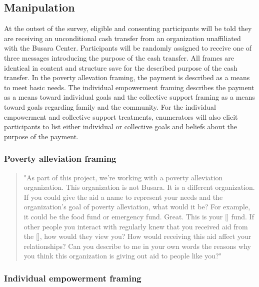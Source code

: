 \documentclass[11pt, a4paper]{article}\usepackage[]{graphicx}\usepackage[]{color}
\begin{document}
    \subsection{Manipulation}

        At the outset of the survey, eligible and consenting participants will be told they are receiving an unconditional cash transfer from an organization unaffiliated with the Busara Center. Participants will be randomly assigned to receive one of three messages introducing the purpose of the cash transfer. All frames are identical in content and structure save for the described purpose of the cash transfer. In the poverty allevation framing, the payment is described as a means to meet basic needs. The individual empowerment framing describes the payment as a means toward individual goals and the collective support framing as a means toward goals regarding family and the community. For the individual empowerment and collective support treatments, enumerators will also elicit participants to list either individual or collective goals and beliefs about the purpose of the payment.

        \subsubsection{Poverty alleviation framing}

            \begin{quote}

                "As part of this project, we're working with a poverty alleviation organization. This organization is not Busara. It is a different organization.
                If you could give the aid a name to represent your needs and the organization's goal of poverty alleviation, what would it be? For example, it could be the food fund or emergency fund.
                Great. This is your [] fund.
                If other people you interact with regularly knew that you received aid from the [], how would they view you?
                How would receiving this aid affect your relationships?
                Can you describe to me in your own words the reasons why you think this organization is giving out aid to people like you?"

            \end{quote}

        \subsubsection{Individual empowerment framing}
\end{document}
